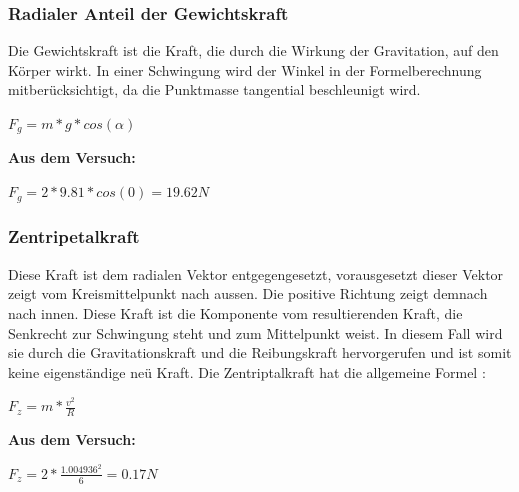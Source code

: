 \documentclass[../main.tex]{subfiles}
\begin{document}
\subsubsection{Radialer Anteil der Gewichtskraft}
Die Gewichtskraft ist die Kraft, die durch die Wirkung der Gravitation, auf den Körper wirkt. In einer Schwingung wird der Winkel in der Formelberechnung mitberücksichtigt, da die Punktmasse tangential beschleunigt wird.\cite{tiplerpaula.PhysikFurStudierende}
\begin{mdframed}
$F_g = m * g * cos(\alpha)$
\end{mdframed}
\textbf {Aus dem Versuch:}
\begin{mdframed}
$F_g = 2 * 9.81 * cos(0) = 19.62N$
\end{mdframed}
\subsubsection{Zentripetalkraft}
Diese Kraft ist dem radialen Vektor entgegengesetzt, vorausgesetzt dieser Vektor zeigt vom Kreismittelpunkt nach aussen. Die positive Richtung zeigt demnach nach innen. Diese Kraft ist die Komponente vom resultierenden Kraft, die Senkrecht zur Schwingung steht und zum Mittelpunkt weist. In diesem Fall wird sie durch die Gravitationskraft und die Reibungskraft hervorgerufen und ist somit keine eigenständige neü Kraft.
Die Zentriptalkraft hat die allgemeine Formel \cite{tiplerpaula.PhysikFurStudierende}:
\begin{mdframed}
$F_z=m * \frac{v^2}{R} $
\end{mdframed}
\textbf {Aus dem Versuch:}
\begin{mdframed}
$F_z = 2 * \frac{1.004936^2}{6} = 0.17N$
\end{mdframed}
\end{document}
